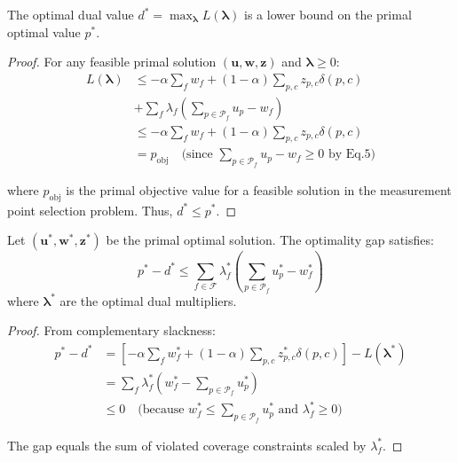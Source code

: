 
\begin{theorem}
The optimal dual value \(d^* = \max_{\boldsymbol{\lambda}} L(\boldsymbol{\lambda})\) is a lower bound on the primal optimal value \(p^*\).
\end{theorem}

\begin{proof}
For any feasible primal solution \((\mathbf{u},\mathbf{w},\mathbf{z})\) and \(\boldsymbol{\lambda} \geq 0\):
{\footnotesize
\[
\begin{aligned}
L(\boldsymbol{\lambda}) &\leq -\alpha \sum_f w_f + (1-\alpha) \sum_{p,c} z_{p,c} \delta(p,c) \\
&+ \sum_f \lambda_f \left( \sum_{p \in \mathcal{P}_f} u_p - w_f \right) \\
&\leq -\alpha \sum_f w_f + (1-\alpha) \sum_{p,c} z_{p,c} \delta(p,c) \\
&= p_{\text{obj}} \quad \text{(since } \sum_{p \in \mathcal{P}_f} u_p - w_f \geq 0 \text{ by Eq.5)}
\end{aligned}
\]
}

\noindent where $p_{\text{obj}}$ is the primal objective value for a feasible solution in the measurement point selection problem. Thus, \(d^* \leq p^*\).
\end{proof}

\begin{theorem}
Let \((\mathbf{u}^*,\mathbf{w}^*,\mathbf{z}^*)\) be the primal optimal solution. The optimality gap satisfies:
\[
p^* - d^* \leq \sum_{f \in \mathcal{F}} \lambda_f^* \left( \sum_{p \in \mathcal{P}_f} u_p^* - w_f^* \right)
\]
where \(\boldsymbol{\lambda}^*\) are the optimal dual multipliers.
\end{theorem}

\begin{proof}
From complementary slackness:
{\footnotesize
\[
\begin{aligned}
p^* - d^* &= \left[ -\alpha \sum_f w_f^* + (1-\alpha) \sum_{p,c} z_{p,c}^* \delta(p,c) \right] - L(\boldsymbol{\lambda}^*) \\
&= \sum_f \lambda_f^* \left( w_f^* - \sum_{p \in \mathcal{P}_f} u_p^* \right) \\
&\leq 0 \quad \text{(because } w_f^* \leq \sum_{p \in \mathcal{P}_f} u_p^* \text{ and } \lambda_f^* \geq 0\text{)}
\end{aligned}
\]
}

\noindent The gap equals the sum of violated coverage constraints scaled by \(\lambda_f^*\).
\end{proof}

